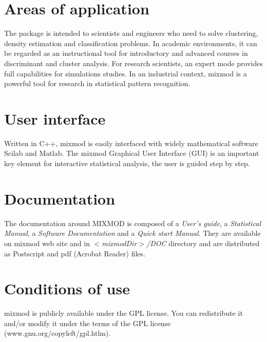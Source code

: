 \section{Areas of application }
The package is intended to scientists and engineers who need to
solve clustering, density estimation and classification problems. In
academic environments, it can be regarded as an instructional tool for introductory
and advanced courses in discriminant and cluster analysis. For
research scientists, an expert mode provides full capabilities for
simulations studies. In an industrial context, {\sc mixmod} is a powerful tool for research in statistical
pattern recognition.

\section{User interface}
Written in C++, {\sc mixmod} is easily interfaced with widely mathematical software Scilab and Matlab.
The {\sc mixmod} Graphical User Interface (GUI) is an important key element for
interactive statistical analysis, the user is guided step by step.

\section{Documentation}
The documentation around {\sc MIXMOD} is composed of a {\em User's guide}, a {\it
Statistical Manual}, a {\em Software Documentation} and a {\em Quick start Manual}.
They are available on {\sc mixmod} web site and in  {\em  $<$mixmodDir$>$/DOC} directory
and are distributed as Postscript and pdf (Acrobat Reader) files.

\section{Conditions of use}
{\sc mixmod} is publicly available under the GPL license. You can redistribute it and/or modify it under the terms of
the GPL license (www.gnu.org/copyleft/gpl.htlm).\\

